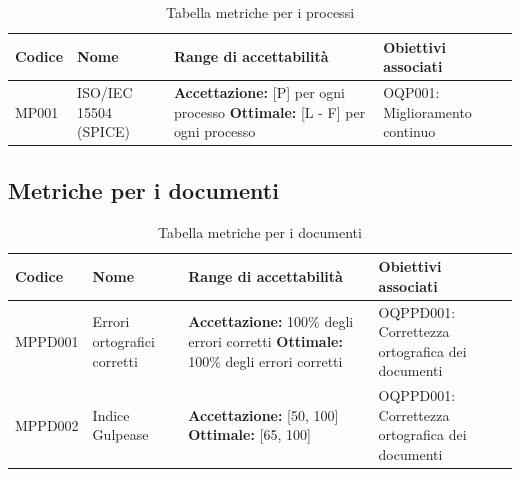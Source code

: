 \documentclass[openany,12pt,a4paper]{report}
\begin{document}
	\begin{longtable}{| p{2cm} | p{3.5cm} |p{5.5cm} | p{5.5cm} |}
		\caption {Tabella metriche per i processi} \label{tab:tabella metriche per i processi} \\
		\hline
		\textbf{Codice} & \textbf{Nome} & \textbf{Range di accettabilità} & \textbf{Obiettivi associati}\\
		\hline
		\endhead
		
		\newline MP001&
		\newline ISO/IEC 15504 (SPICE)&
		\newline \textbf{Accettazione:} [P] per ogni processo 
		\newline \textbf{Ottimale:} [L - F] per ogni processo&
		\newline OQP001: Miglioramento continuo
		\\[1em]
		
		\hline
	\end{longtable}
	
	
	\subsection{Metriche per i documenti}
	
	\begin{longtable}{| p{2cm} | p{3.5cm} |p{5.5cm} | p{5.5cm} |}
		\caption {Tabella metriche per i documenti} \label{tab:tabella metriche per i documenti} \\
		\hline
		\textbf{Codice} & \textbf{Nome} & \textbf{Range di accettabilità} & \textbf{Obiettivi associati}\\
		\hline
		\endhead
		
		\newline MPPD001 &
		\newline Errori ortografici corretti &
		\newline \textbf{Accettazione:} 100\% degli errori corretti
		\newline \textbf{Ottimale:} 100\% degli errori corretti&
		\newline OQPPD001: Correttezza ortografica dei documenti
		\\[1em]
		
		\hline
		
		\newline MPPD002 &
		\newline Indice Gulpease &
		\newline \textbf{Accettazione:} [50, 100] 
		\newline \textbf{Ottimale:} [65, 100]&
		\newline OQPPD001: Correttezza ortografica dei documenti
		\\[1em]
		
		\hline
	\end{longtable}
\end{document}
